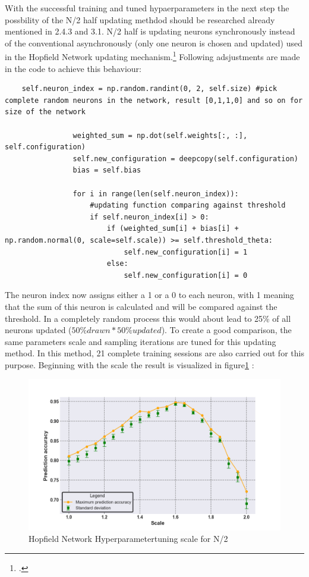 With the successful training and tuned hypaerparameters in the next step the possbility of the N/2 half updating methdod should be researched already mentioned in 2.4.3 and 3.1.
N/2 half is updating neurons synchronously instead of the conventional asynchronously (only one neuron is chosen and updated) used in the Hopfield Network updating mechanism.\footcite[cf.][23-24]{caiHarnessingIntrinsicNoise2019}
Following adsjustments are made in the code to achieve this behaviour:
\begin{lstlisting}
    self.neuron_index = np.random.randint(0, 2, self.size) #pick complete random neurons in the network, result [0,1,1,0] and so on for size of the network

                weighted_sum = np.dot(self.weights[:, :], self.configuration)   
                self.new_configuration = deepcopy(self.configuration)
                bias = self.bias 

                for i in range(len(self.neuron_index)):              
                    #updating function comparing against threshold
                    if self.neuron_index[i] > 0:
                        if (weighted_sum[i] + bias[i] + np.random.normal(0, scale=self.scale)) >= self.threshold_theta:          
                            self.new_configuration[i] = 1
                        else:
                            self.new_configuration[i] = 0
\end{lstlisting}
The neuron index now assigns either a 1 or a 0 to each neuron, with 1 meaning that the sum of this neuron is calculated and will be compared against the threshold. 
In a completely random process this would about lead to 25\% of all neurons updated (\(50\% drawn * 50\% updated\)).
To create a good comparison, the same parameters scale and sampling iterations are tuned for this updating method. 
In this method, 21 complete training sessions are also carried out for this purpose.
Beginning with the scale the result is visualized in figure\ref{Hyperparamers_Scale_mit} :
\begin{figure}[H]
    \centering
    \includegraphics[width=0.9\linewidth]{graphics/NEW_Scale_MIT_N2_Half_Pred_Acc.png}
    \caption{Hopfield Network Hyperparametertuning scale for N/2}
    \label{Hyperparamers_Scale_mit}
\end{figure}

